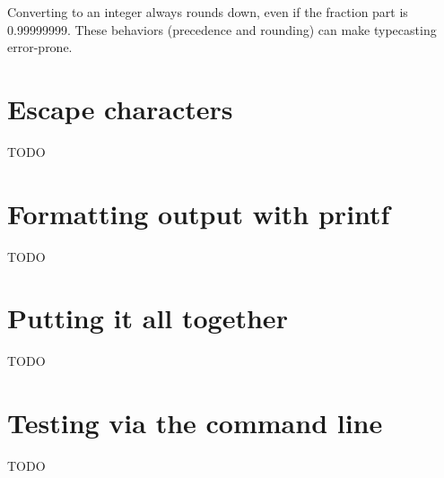 Converting to an integer always rounds down, even if the fraction part is 0.99999999.
These behaviors (precedence and rounding) can make typecasting error-prone.


\section{Escape characters}

TODO


\section{Formatting output with printf}

TODO


\section{Putting it all together}

TODO


\section{Testing via the command line}

TODO
